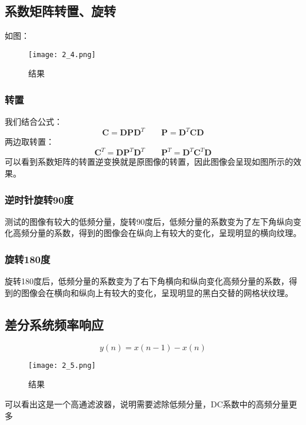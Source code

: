 \documentclass[12pt]{article}
\begin{document}
\subsection{系数矩阵转置、旋转}

如图：
\begin{figure}[H]
    \centering
    \texttt{[image: 2\_4.png]}
    \caption{结果}
\end{figure}

\subsubsection{转置}
我们结合公式：
\begin{equation}
    \mathbf{C} = \mathbf{DPD}^T \qquad \mathbf{P} = \mathbf{D}^T\mathbf{CD}
\end{equation}
\hspace*{2em}两边取转置：
\begin{equation}
    \mathbf{C}^T = \mathbf{DP}^T\mathbf{D}^T \qquad \mathbf{P}^T = \mathbf{D}^T\mathbf{C}^T\mathbf{D}
\end{equation}
\hspace*{2em}可以看到系数矩阵的转置逆变换就是原图像的转置，因此图像会呈现如图所示的效果。

\subsubsection{逆时针旋转90度}
测试的图像有较大的低频分量，旋转90度后，低频分量的系数变为了左下角纵向变化高频分量的系数，得到的图像会在纵向上有较大的变化，呈现明显的横向纹理。
\subsubsection{旋转180度}
旋转180度后，低频分量的系数变为了右下角横向和纵向变化高频分量的系数，得到的图像会在横向和纵向上有较大的变化，呈现明显的黑白交替的网格状纹理。
\subsection{差分系统频率响应}
\begin{equation}
    y(n) = x(n-1) - x(n)
\end{equation}

\begin{figure}[H]
    \centering
    \texttt{[image: 2\_5.png]}
    \caption{结果}
\end{figure}
可以看出这是一个高通滤波器，说明需要滤除低频分量，DC系数中的高频分量更多
\end{document}
